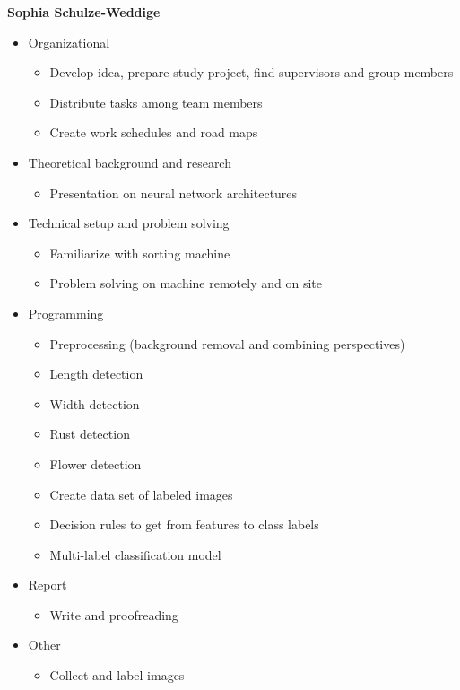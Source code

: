 \bigskip
\textbf{Sophia Schulze-Weddige}
\begin{itemize}
	\item Organizational
	\begin{itemize}
		\item Develop idea, prepare study project, find supervisors and group members
		\item Distribute tasks among team members
		\item Create work schedules and road maps
	\end{itemize}
	\item Theoretical background and research
	\begin{itemize}
		\item Presentation on neural network architectures
	\end{itemize}
	\item Technical setup and problem solving
	\begin{itemize}
		\item Familiarize with sorting machine
		\item Problem solving on machine remotely and on site
	\end{itemize}
	\item Programming
	\begin{itemize}
		\item Preprocessing (background removal and combining perspectives)
		\item Length detection
		\item Width detection
		\item Rust detection
		\item Flower detection
		\item Create data set of labeled images
		\item Decision rules to get from features to class labels
		\item Multi-label classification model
	\end{itemize}
	\item Report
	\begin{itemize}
		\item Write and proofreading
	\end{itemize}
	\item Other
	\begin{itemize}
		\item Collect and label images
	\end{itemize}
\end{itemize}

